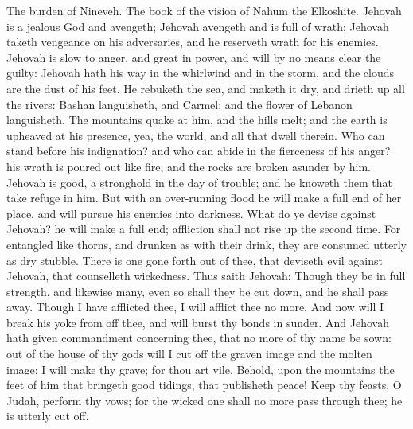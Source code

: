 


The burden of Nineveh. The book of the vision of Nahum the Elkoshite.  Jehovah is a jealous God and avengeth; Jehovah avengeth and is full of wrath; Jehovah taketh vengeance on his adversaries, and he reserveth wrath for his enemies. Jehovah is slow to anger, and great in power, and will by no means clear the guilty: Jehovah hath his way in the whirlwind and in the storm, and the clouds are the dust of his feet. He rebuketh the sea, and maketh it dry, and drieth up all the rivers: Bashan languisheth, and Carmel; and the flower of Lebanon languisheth. The mountains quake at him, and the hills melt; and the earth is upheaved at his presence, yea, the world, and all that dwell therein. Who can stand before his indignation? and who can abide in the fierceness of his anger? his wrath is poured out like fire, and the rocks are broken asunder by him. Jehovah is good, a stronghold in the day of trouble; and he knoweth them that take refuge in him. But with an over-running flood he will make a full end of her place, and will pursue his enemies into darkness.  What do ye devise against Jehovah? he will make a full end; affliction shall not rise up the second time. For entangled like thorns, and drunken as with their drink, they are consumed utterly as dry stubble. There is one gone forth out of thee, that deviseth evil against Jehovah, that counselleth wickedness. Thus saith Jehovah: Though they be in full strength, and likewise many, even so shall they be cut down, and he shall pass away. Though I have afflicted thee, I will afflict thee no more. And now will I break his yoke from off thee, and will burst thy bonds in sunder.  And Jehovah hath given commandment concerning thee, that no more of thy name be sown: out of the house of thy gods will I cut off the graven image and the molten image; I will make thy grave; for thou art vile.  Behold, upon the mountains the feet of him that bringeth good tidings, that publisheth peace! Keep thy feasts, O Judah, perform thy vows; for the wicked one shall no more pass through thee; he is utterly cut off. 

